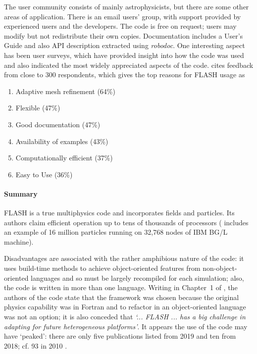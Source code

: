 The user community consists of mainly astrophysicists, but there are some other areas of application.
There is an email users' group, with support provided by experienced users and the developers.
The code is free on request; users may modify but not redistribute their own copies.
Documentation includes a User's Guide and also API description extracted using {\it robodoc}.
One interesting aspect has been user surveys, which
have provided insight into how the code was used and also 
indicated the most widely appreciated aspects of the code.
\cite{Du09Exte} cites feedback from close to 300 respondents, which gives
the top reasons for FLASH usage as
\begin{enumerate}
\item Adaptive mesh refinement (64\%)
\item Flexible (47\%)
\item  Good documentation (47\%)
\item  Availability of examples (43\%)
\item  Computationally efficient (37\%)
\item  Easy to Use (36\%)
\end{enumerate}


\paragraph{Summary}

FLASH is a true multiphysics code and incorporates fields and particles.  Its 
authors claim efficient operation up to tens of thousands of processors 
(\cite{Du09Exte} includes an example of 16 million particles running on 32,768 
nodes of IBM BG/L machine).  %



Disadvantages are associated with the rather amphibious nature of the code: it 
uses build-time methods to achieve object-oriented features from 
non-object-oriented languages and so must be largely recompiled for each 
simulation; also, the code is written in more than one language.  Writing in 
Chapter~1 of \cite{carverhong}, the authors of the code state that the 
framework was chosen because the original physics capability was in Fortran and 
to refactor in an object-oriented language was not an option; it is also 
conceded that {\it `... FLASH ... has a big challenge in adapting for 
future heterogeneous platforms'}.  It appears the use of the code may have 
`peaked': there are only five publications listed from 2019 and ten from 2018; 
cf. 93 in 2010 \cite{flashwebsite}.


